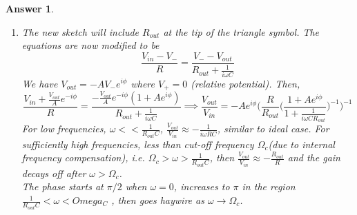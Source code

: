 \documentclass[a4paper]{article}
\newtheorem{ans}{Answer}[subsection]
\theoremstyle{new}
\begin{document}
\begin{ans}
\begin{enumerate}[label=(\alph*)]
\begin{itemize}
    \item non-ideal operational amplifier have finite input resistance (not infinite) and non-zero output resistance;
    \item output voltage is capped at some finite magnitude, i.e. saturate.
\end{itemize}
For finite $V_{out}$ below saturation, we have
$$V_{out}=|A(\omega)|e^{i\phi(\omega)}(V_+-V_-)$$
Since $\phi(\omega)\rightarrow\pi$ as $\omega$ approaches some critical frequency, the operational amplifier has an internal frequency compensation that ensures amplitude $A$ to fall off before the critical frequency. This is to prevent inter-conversion between positive and negative feedback.\\[5pt]
Other differencies include 
\begin{itemize}
    \item the input bias current: produce spurious output voltage even when there is no input signal;
    \item the input offset voltage: small voltage needed as the input to make the output zero, which undesireably shifts the zero level and limits the maximum signal, leading to clipping;
    \item slewing rate: rate of change of voltage is a ramp instead of a step, especially for large input signals.
\end{itemize}
\item The new sketch will include $R_{out}$ at the tip of the triangle symbol. The equations are now modified to be
$$\frac{V_{in}-V_-}{R}=\frac{V_--V_{out}}{R_{out}+\frac{1}{i\omega C}}$$
We have $V_{out}=-AV_-e^{i\phi}$ where $V_+=0$ (relative potential). Then,
$$\frac{V_{in}+\frac{V_{out}}{A}e^{-i\phi}}{R}=\frac{-\frac{V_{out}}{A}e^{-i\phi}(1+Ae^{i\phi})}{R_{out}+\frac{1}{i\omega C}}\implies\frac{V_{out}}{V_{in}}=-Ae^{i\phi}\bigg(\frac{R}{R_{out}}\bigg(\frac{1+Ae^{i\phi}}{1+\frac{1}{i\omega CR_{out}}}\bigg)^{-1}\bigg)^{-1}$$
For low frequencies, $\omega<<\frac{1}{R_{out}C}$, $\frac{V_{out}}{V_{in}}\approx-\frac{1}{i\omega RC}$, similar to ideal case. For sufficiently high frequencies, less than cut-off frequency $\Omega_c $(due to internal frequency compensation), i.e. $\Omega_c>\omega>\frac{1}{R_{out}C}$, then $\frac{V_{out}}{V_{in}}\approx -\frac{R_{out}}{R}$ and the gain decays off after $\omega>\Omega_c$.\\[5pt]
The phase starts at $\pi/2$ when $\omega=0$, increases to $\pi$ in the region $\frac{1}{R_{out}C}<\omega<Omega_C$ , then goes haywire as $\omega\rightarrow\Omega_c$.
\end{enumerate}
\end{ans}
\end{document}
